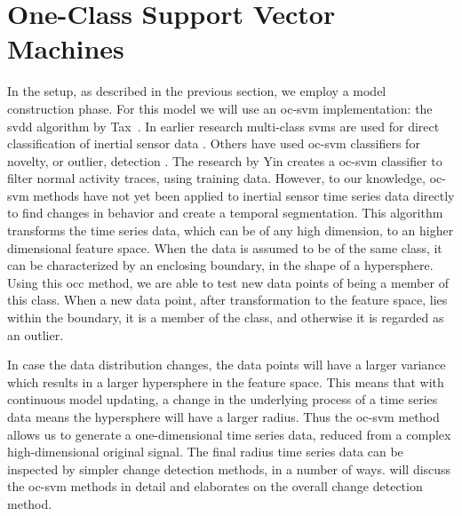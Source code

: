 \section{One-Class Support Vector Machines}
In the setup, as described in the previous section, we employ a model construction phase.
For this model we will use an \acrlong{oc-svm} implementation: the \acrlong{svdd} algorithm by Tax~\cite{tax2001one}.
In earlier research multi-class \glspl{svm} are used for direct classification of inertial sensor data \cite{he2008activity,mountrakis2011support,anguita2012human}.
Others have used \gls{oc-svm} classifiers for novelty, or outlier, detection \cite{scholkopf1999support,camci2010change,li2003improving,ma2003time,tax1999support}.
The research by Yin \etal  \cite{yin2008sensor} creates a \gls{oc-svm} classifier to filter normal activity traces, using training data.
However, to our knowledge, \gls{oc-svm} methods have not yet been applied to inertial sensor time series data directly to find changes in behavior and create a temporal segmentation.
This algorithm transforms the time series data, which can be of any high dimension, to an higher dimensional feature space.
When the data is assumed to be of the same class, it can be characterized by an enclosing boundary, in the shape of a hypersphere.
Using this \gls{occ} method, we are able to test new data points of being a member of this class.
When a new data point, after transformation to the feature space, lies within the boundary, it is a member of the class, and otherwise it is regarded as an outlier.

In case the data distribution changes, the data points will have a larger variance which results in a larger hypersphere in the feature space.
This means that with continuous model updating, a change in the underlying process of a time series data means the hypersphere will have a larger radius.
Thus the \gls{oc-svm} method allows us to generate a one-dimensional time series data, reduced from a complex high-dimensional original signal.
The final radius time series data can be inspected by simpler change detection methods, in a number of ways.
 will discuss the \gls{oc-svm} methods in detail and  elaborates on the overall change detection method.

